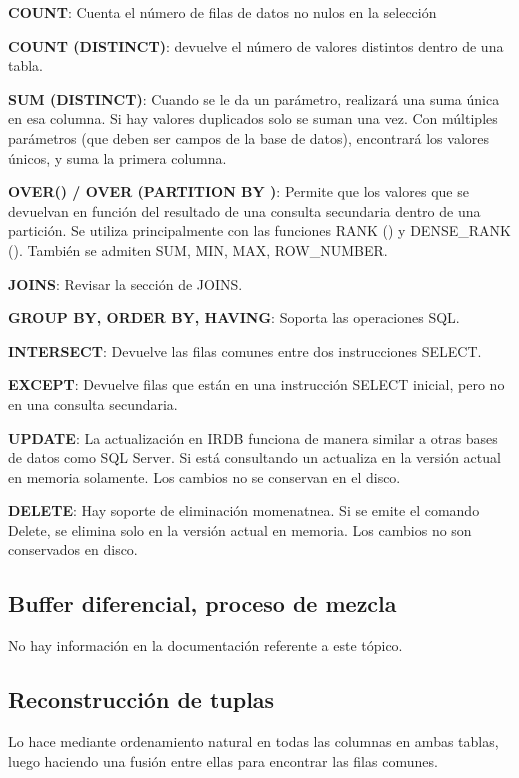 \documentclass{acmart}
\begin{document}
\textbf{COUNT}: Cuenta el número de filas de datos no nulos en la selección

\textbf{COUNT (DISTINCT)}: devuelve el número de valores distintos dentro de una tabla.

\textbf{SUM (DISTINCT)}: Cuando se le da un parámetro, realizará una suma única en esa columna. Si hay
valores duplicados solo se suman una vez. Con múltiples parámetros (que deben ser campos de la base de datos), encontrará los valores únicos, y suma la primera columna.

\textbf{OVER() / OVER (PARTITION BY )}: Permite que los valores que se devuelvan en función del resultado de una consulta secundaria dentro de una partición. Se utiliza principalmente con las funciones RANK () y DENSE\_RANK (). También se admiten SUM, MIN, MAX, ROW\_NUMBER.

\textbf{JOINS}: Revisar la sección de JOINS.

\textbf{GROUP BY, ORDER BY, HAVING}: Soporta las operaciones SQL.

\textbf{INTERSECT}: Devuelve las filas comunes entre dos instrucciones SELECT.

\textbf{EXCEPT}: Devuelve filas que están en una instrucción SELECT inicial, pero no en una consulta secundaria.

\textbf{UPDATE}: La actualización en IRDB funciona de manera similar a otras bases de datos como SQL Server. Si está consultando un actualiza en la versión actual en memoria solamente. Los cambios no se conservan en el disco.

\textbf{DELETE}: Hay soporte de eliminación momenatnea. Si se emite el comando Delete, se elimina solo en la versión actual en memoria. Los cambios no son conservados en disco.

\subsection{Buffer diferencial, proceso de mezcla}

No hay información en la documentación referente a este tópico.

\subsection{Reconstrucción de tuplas}

Lo hace mediante ordenamiento natural en todas las columnas en ambas tablas, luego haciendo una fusión entre ellas para encontrar las filas comunes.
\end{document}
